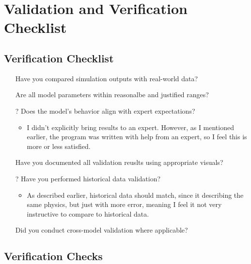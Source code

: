 \section{Validation and Verification Checklist}

\subsection{Verification Checklist}

\begin{itemize}
\item[\checkmark] Have you compared simulation outputs with real-world data?
\item[\checkmark] Are all model parameters within reasonalbe and justified ranges?
\item[?] Does the model's behavior align with expert expectations?
  \begin{itemize}
  \item I didn't explicitly bring results to an expert. However, as I mentioned earlier, the program was written with help from an expert, so I feel this is more or less satisfied.
  \end{itemize}
\item[\checkmark] Have you documented all validation reuslts using appropriate visuals?
\item[?] Have you performed historical data validation?
  \begin{itemize}
  \item As described earlier, historical data should match, since it describing the same physics, but just with more error, meaning I feel it not very instructive to compare to historical data.
  \end{itemize}
\item[\checkmark] Did you conduct cross-model validation where applicable?
\end{itemize}


\subsection{Verification Checks}

